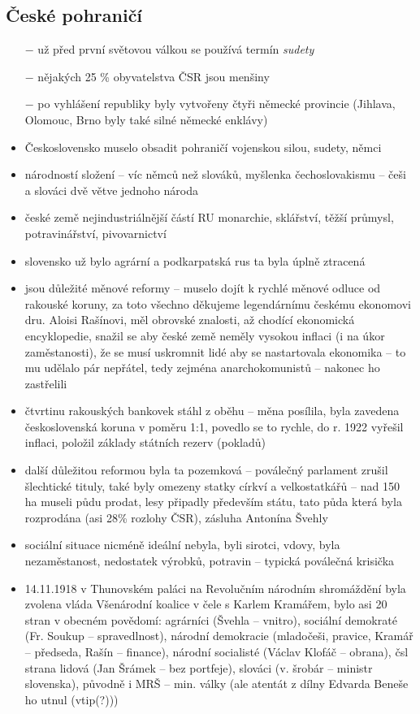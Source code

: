 \documentclass{article}
\begin{document}
\subsection*{České pohraničí}
\begin{itemize}
    \vspace{-0.5em}
    \setlength\itemsep{0.15em}
    \item[$-$] už před první světovou válkou se používá termín \textit{sudety}
    \item[$-$] nějakých 25 \% obyvatelstva ČSR jsou menšiny
    \item[$-$] po vyhlášení republiky byly vytvořeny čtyři německé provincie (Jihlava, Olomouc, Brno byly také silné německé enklávy)
  \item Československo muselo obsadit pohraničí vojenskou silou, sudety, němci
  \item národností složení -- víc němců než slováků, myšlenka čechoslovakismu -- češi a slováci dvě větve jednoho národa
  \item české země nejindustriálnější částí RU monarchie, sklářství, těžší průmysl, potravinářství, pivovarnictví
  \item slovensko už bylo agrární a podkarpatská rus ta byla úplně ztracená
  \item jsou důležité měnové reformy -- muselo dojít k rychlé měnové odluce od rakouské koruny, za toto všechno děkujeme legendárnímu českému ekonomovi dru. Aloisi Rašínovi, měl obrovské znalosti, až chodící ekonomická encyklopedie, snažil se aby české země neměly vysokou inflaci (i na úkor zaměstanosti), že se musí uskromnit lidé aby se nastartovala ekonomika -- to mu udělalo pár nepřátel, tedy zejména anarchokomunistů -- nakonec ho zastřelili
  \item čtvrtinu rakouských bankovek stáhl z oběhu -- měna posílila, byla zavedena československá koruna v poměru 1:1, povedlo se to rychle, do r. 1922 vyřešil inflaci, položil základy státních rezerv (pokladů)
  \item další důležitou reformou byla ta pozemková -- poválečný parlament zrušil šlechtické tituly, také byly omezeny statky církví a velkostatkářů -- nad 150 ha museli půdu prodat, lesy připadly především státu, tato půda která byla rozprodána (asi 28\% rozlohy ČSR), zásluha Antonína Švehly
  \item sociální situace nicméně ideální nebyla, byli sirotci, vdovy, byla nezaměstanost, nedostatek výrobků, potravin -- typická poválečná krisička
  \item 14.11.1918 v Thunovském paláci na Revolučním národním shromáždění byla zvolena vláda Všenárodní koalice v čele s Karlem Kramářem, bylo asi 20 stran v obecném povědomí: agrárníci (Švehla -- vnitro), sociální demokraté (Fr. Soukup -- spravedlnost), národní demokracie (mladočeši, pravice, Kramář -- předseda, Rašín -- finance), národní socialisté (Václav Klofáč -- obrana), čsl strana lidová (Jan Šrámek -- bez portfeje), slováci (v. šrobár -- ministr slovenska), původně i MRŠ -- min. války (ale atentát z dílny Edvarda Beneše ho utnul (vtip(?)))

\end{itemize}
\end{document}
